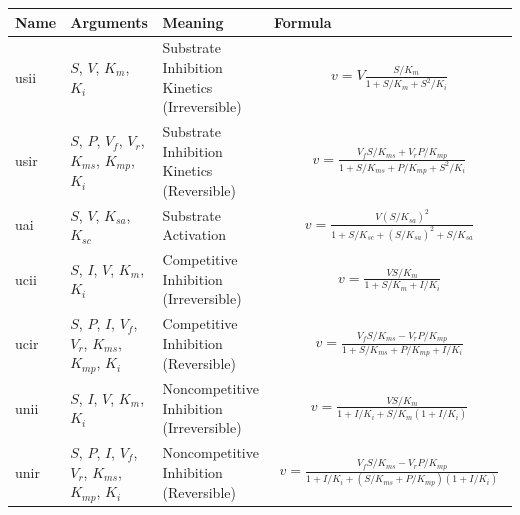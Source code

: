\documentclass[10pt]{cekarticle}
\newcommand{\changed}[1]{\textcolor{BrickRed}{#1}}
\begin{document}
\addtocounter{table}{-1}
\begin{table}[ht]
\setlength{\abovedisplayskip}{-2pt}
\setlength{\belowdisplayskip}{1pt}
\begin{tabular}{|p{0.5in}|>{\raggedright}m{0.77in}|>{\raggedright}m{1.5in}|m{3in}|}
\hline
\textbf{Name} & \textbf{Arguments} & \textbf{Meaning} &
\textbf{Formula} \\
\hline

usii & $S$, $V$, $K_m$, $K_i$ & Substrate Inhibition Kinetics
(Irreversible) &
\begin{gather*}
v = V \frac{S/K_m}{1 + S/K_m + S^2/K_i}
\end{gather*}
\\ \hline

usir & $S$, $P$, $V_f$, $V_r$, $K_{ms}$, $K_{mp}$, $K_i$ & Substrate
Inhibition Kinetics (Reversible) &
\begin{gather*}
v = \frac{V_f S/K_{ms} + V_r
P/K_{mp}}{1 + S/K_{ms} + P/K_{mp} + S^2/K_i}
\end{gather*}
\\ \hline

uai & $S$, $V$, $K_{sa}$, $K_{sc}$ & Substrate Activation &
\begin{gather*}
v = \frac{V \left( S/K_{sa} \right)^2}{1 + S/K_{sc} + \left( S/K_{sa}\right)^2
  + S/K_{sa}}
\end{gather*}
\\ \hline

ucii & $S$, \changed{$I$}, $V$, $K_m$, $K_i$ & Competitive Inhibition (Irreversible) &
\begin{gather*}
v = \frac{V S/K_m}{1 + S/K_m + I/K_i}
\end{gather*}
\\ \hline

ucir & $S$, $P$, \changed{$I$}, $V_f$, $V_r$, $K_{ms}$, $K_{mp}$, $K_i$ & Competitive Inhibition
(Reversible) &
\begin{gather*}
v = \frac{V_f S/K_{ms} - V_r P/K_{mp}}{1 +
  S/K_{ms} + P/K_{mp} + I/K_i}
\end{gather*}
\\ \hline

unii & $S$, $I$, $V$, $K_m$, $K_i$ & Noncompetitive Inhibition
(Irreversible) &
\begin{gather*}
v = \frac{V S/K_m}{1 + I/K_i + S/K_m \left( 1 + I/K_i\right) }
\end{gather*}
\\ \hline

unir & $S$, $P$, $I$, $V_f$, \changed{$V_r$}, $K_{ms}$, $K_{mp}$, $K_i$ & Noncompetitive
Inhibition (Reversible) &
\begin{gather*}
v = \frac{V_f S/K_{ms} - V_r P/K_{mp}}{1 +
  I/K_i + \left( S/K_{ms} + P/K_{mp} \right) \left( 1 + I/K_i\right) }
\end{gather*}
\\ \hline


\end{tabular}
\end{table}
\end{document}
